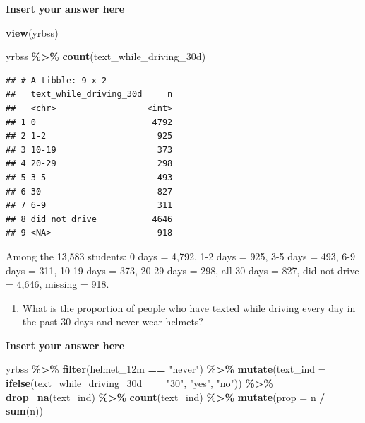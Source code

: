 \documentclass[
]{article}
\newenvironment{Shaded}{\begin{snugshade}}{\end{snugshade}}
\newcommand{\AttributeTok}[1]{\textcolor[rgb]{0.13,0.29,0.53}{#1}}
\newcommand{\FunctionTok}[1]{\textcolor[rgb]{0.13,0.29,0.53}{\textbf{#1}}}
\newcommand{\NormalTok}[1]{#1}
\newcommand{\SpecialCharTok}[1]{\textcolor[rgb]{0.81,0.36,0.00}{\textbf{#1}}}
\newcommand{\StringTok}[1]{\textcolor[rgb]{0.31,0.60,0.02}{#1}}
\providecommand{\tightlist}{%
  \setlength{\itemsep}{0pt}\setlength{\parskip}{0pt}}
\begin{document}
\textbf{Insert your answer here}

\begin{Shaded}
\begin{Highlighting}[]
\FunctionTok{view}\NormalTok{(yrbss)}
\end{Highlighting}
\end{Shaded}

\begin{Shaded}
\begin{Highlighting}[]
\NormalTok{yrbss }\SpecialCharTok{\%\textgreater{}\%}
  \FunctionTok{count}\NormalTok{(text\_while\_driving\_30d)}
\end{Highlighting}
\end{Shaded}

\begin{verbatim}
## # A tibble: 9 x 2
##   text_while_driving_30d     n
##   <chr>                  <int>
## 1 0                       4792
## 2 1-2                      925
## 3 10-19                    373
## 4 20-29                    298
## 5 3-5                      493
## 6 30                       827
## 7 6-9                      311
## 8 did not drive           4646
## 9 <NA>                     918
\end{verbatim}

Among the 13,583 students: 0 days = 4,792, 1-2 days = 925, 3-5 days =
493, 6-9 days = 311, 10-19 days = 373, 20-29 days = 298, all 30 days =
827, did not drive = 4,646, missing = 918.

\begin{enumerate}
\def\labelenumi{\arabic{enumi}.}
\setcounter{enumi}{1}
\tightlist
\item
  What is the proportion of people who have texted while driving every
  day in the past 30 days and never wear helmets?
\end{enumerate}

\textbf{Insert your answer here}

\begin{Shaded}
\begin{Highlighting}[]
\NormalTok{yrbss }\SpecialCharTok{\%\textgreater{}\%}
  \FunctionTok{filter}\NormalTok{(helmet\_12m }\SpecialCharTok{==} \StringTok{"never"}\NormalTok{) }\SpecialCharTok{\%\textgreater{}\%}
  \FunctionTok{mutate}\NormalTok{(}\AttributeTok{text\_ind =} \FunctionTok{ifelse}\NormalTok{(text\_while\_driving\_30d }\SpecialCharTok{==} \StringTok{"30"}\NormalTok{, }\StringTok{"yes"}\NormalTok{, }\StringTok{"no"}\NormalTok{)) }\SpecialCharTok{\%\textgreater{}\%}
  \FunctionTok{drop\_na}\NormalTok{(text\_ind) }\SpecialCharTok{\%\textgreater{}\%}
  \FunctionTok{count}\NormalTok{(text\_ind) }\SpecialCharTok{\%\textgreater{}\%}
  \FunctionTok{mutate}\NormalTok{(}\AttributeTok{prop =}\NormalTok{ n }\SpecialCharTok{/} \FunctionTok{sum}\NormalTok{(n))}
\end{Highlighting}
\end{Shaded}
\end{document}
